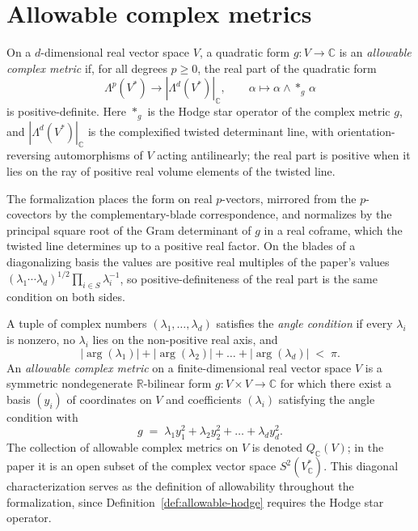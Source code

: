 \section{Allowable complex metrics}

\begin{definition}
  \label{def:allowable-hodge}
  \leanok
  On a $d$-dimensional real vector space $V$, a quadratic form
  $g \colon V \to \mathbb C$ is an \emph{allowable complex metric} if, for
  all degrees $p \geq 0$, the real part of the quadratic form
  \[
    \Lambda^p(V^*) \longrightarrow |\Lambda^d(V^*)|_{\mathbb C}, \qquad
    \alpha \mapsto \alpha \wedge *_g\, \alpha
  \]
  is positive-definite. Here $*_g$ is the Hodge star operator of the complex
  metric $g$, and $|\Lambda^d(V^*)|_{\mathbb C}$ is the complexified twisted
  determinant line, with orientation-reversing automorphisms of $V$ acting
  antilinearly; the real part is positive when it lies on the ray of
  positive real volume elements of the twisted line.

  The formalization places the form on real $p$-vectors, mirrored from the
  $p$-covectors by the complementary-blade correspondence, and normalizes by
  the principal square root of the Gram determinant of $g$ in a real
  coframe, which the twisted line determines up to a positive real factor.
  On the blades of a diagonalizing basis the values are positive real
  multiples of the paper's values
  $(\lambda_1 \cdots \lambda_d)^{1/2} \prod_{i \in S} \lambda_i^{-1}$, so
  positive-definiteness of the real part is the same condition on both
  sides.
\end{definition}

\begin{definition}
  \label{def:allowable}
  \leanok
  A tuple of complex numbers $(\lambda_1, \dots, \lambda_d)$ satisfies the
  \emph{angle condition} if every $\lambda_i$ is nonzero, no $\lambda_i$ lies
  on the non-positive real axis, and
  \[
    |\arg(\lambda_1)| + |\arg(\lambda_2)| + \dots + |\arg(\lambda_d)|
    \;<\; \pi.
    \tag{4}
  \]
  An \emph{allowable complex metric} on a finite-dimensional real vector
  space $V$ is a symmetric nondegenerate $\mathbb R$-bilinear form
  $g \colon V \times V \to \mathbb C$ for which there exist a basis
  $(y_i)$ of coordinates on $V$ and coefficients $(\lambda_i)$ satisfying
  the angle condition with
  \[
    g \;=\; \lambda_1 y_1^2 + \lambda_2 y_2^2 + \dots + \lambda_d y_d^2 .
  \]
  The collection of allowable complex metrics on $V$ is denoted
  $Q_{\mathbb C}(V)$; in the paper it is an open subset of the complex
  vector space $S^2(V^*_{\mathbb C})$. This diagonal characterization serves
  as the definition of allowability throughout the formalization, since
  Definition~\ref{def:allowable-hodge} requires the Hodge star operator.
\end{definition}

